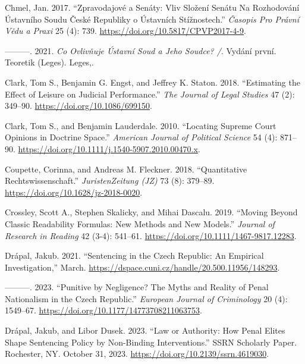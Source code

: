 \documentclass[
  11pt,
]{article}
\newlength{\cslhangindent}
\newenvironment{CSLReferences}[2] %
 {%
  \setlength{\parindent}{0pt}
  \ifodd #1 \everypar{\setlength{\hangindent}{\cslhangindent}}\ignorespaces\fi
  \ifnum #2 > 0
  \setlength{\parskip}{#2\baselineskip}
  \fi
 }%
 {}
\begin{document}
\begin{CSLReferences}{1}{0}
\leavevmode{}%
Chmel, Jan. 2017. {``Zpravodajové a Senáty: {Vliv} Složení Senátu Na
Rozhodování {Ústavního} Soudu {České} Republiky o Ústavních
Stížnostech.''} \emph{Časopis Pro Právní Vědu a Praxi} 25 (4): 739.
\url{https://doi.org/10.5817/CPVP2017-4-9}.

\leavevmode{}%
---------. 2021. \emph{Co Ovlivňuje {Ústavní} Soud a Jeho Soudce? /}.
Vydání první. Teoretik ({Leges}). {Leges,}.

\leavevmode{}%
Clark, Tom S., Benjamin G. Engst, and Jeffrey K. Staton. 2018.
{``Estimating the {Effect} of {Leisure} on {Judicial Performance}.''}
\emph{The Journal of Legal Studies} 47 (2): 349--90.
\url{https://doi.org/10.1086/699150}.

\leavevmode{}%
Clark, Tom S., and Benjamin Lauderdale. 2010. {``Locating {Supreme Court
Opinions} in {Doctrine Space}.''} \emph{American Journal of Political
Science} 54 (4): 871--90.
\url{https://doi.org/10.1111/j.1540-5907.2010.00470.x}.

\leavevmode{}%
Coupette, Corinna, and Andreas M. Fleckner. 2018. {``Quantitative
{Rechtswissenschaft}.''} \emph{JuristenZeitung (JZ)} 73 (8): 379--89.
\url{https://doi.org/10.1628/jz-2018-0020}.

\leavevmode{}%
Crossley, Scott A., Stephen Skalicky, and Mihai Dascalu. 2019. {``Moving
Beyond Classic Readability Formulas: New Methods and New Models.''}
\emph{Journal of Research in Reading} 42 (3-4): 541--61.
\url{https://doi.org/10.1111/1467-9817.12283}.

\leavevmode{}%
Drápal, Jakub. 2021. {``Sentencing in the {Czech Republic}: {An
Empirical Investigation},''} March.
\url{https://dspace.cuni.cz/handle/20.500.11956/148293}.

\leavevmode{}%
---------. 2023. {``Punitive by Negligence? {The} Myths and Reality of
Penal Nationalism in the {Czech Republic}.''} \emph{European Journal of
Criminology} 20 (4): 1549--67.
\url{https://doi.org/10.1177/14773708211063753}.

\leavevmode{}%
Drápal, Jakub, and Libor Dusek. 2023. {``Law or {Authority}: {How Penal
Elites Shape Sentencing Policy} by {Non-Binding Interventions}.''} SSRN
Scholarly Paper. {Rochester, NY}. October 31, 2023.
\url{https://doi.org/10.2139/ssrn.4619030}.


\end{CSLReferences}
\end{document}

